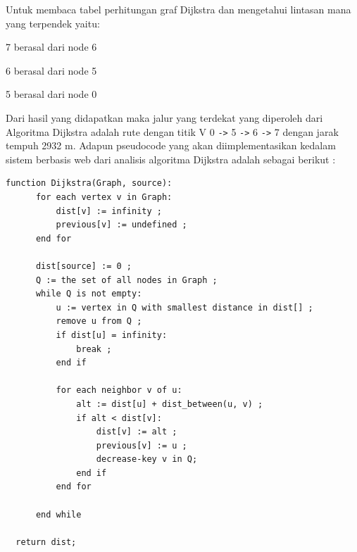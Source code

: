 Untuk membaca tabel perhitungan graf Dijkstra dan mengetahui lintasan mana yang terpendek yaitu:
\par 7 berasal dari node 6
\par 6 berasal dari node 5
\par 5 berasal dari node 0

Dari hasil yang didapatkan maka jalur yang terdekat yang diperoleh dari Algoritma Dijkstra adalah rute dengan titik V 0 \verb|->| 5 \verb|->| 6 \verb|->| 7 dengan jarak tempuh 2932 m. Adapun pseudocode yang akan diimplementasikan kedalam sistem berbasis web dari analisis algoritma Dijkstra adalah sebagai berikut :

\begin{lstlisting}[caption=Pseudocode Algoritma Dijkstra]
function Dijkstra(Graph, source):
      for each vertex v in Graph:                       
          dist[v] := infinity ;         
          previous[v] := undefined ;  
      end for                  
      
      dist[source] := 0 ;   
      Q := the set of all nodes in Graph ;        
      while Q is not empty:             
          u := vertex in Q with smallest distance in dist[] ;
          remove u from Q ;
          if dist[u] = infinity:
              break ;     
          end if        
          
          for each neighbor v of u:       
              alt := dist[u] + dist_between(u, v) ;
              if alt < dist[v]:  
                  dist[v] := alt ;
                  previous[v] := u ;
                  decrease-key v in Q;    
              end if
          end for
          
      end while
      
  return dist;
\end{lstlisting}
\label{PseudocodeAlgoritmaDijkstra}